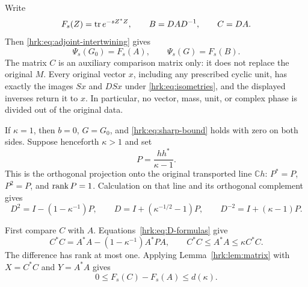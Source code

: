 Write
\[
 F_s(Z)=\operatorname{tr} e^{-sZ^*Z},\qquad B=DAD^{-1},\qquad C=DA.
\]
Then \eqref{hrk:eq:adjoint-intertwining} gives
\begin{equation}\label{hrk:eq:trace-identities}
 \Psi_s(G_0)=F_s(A),\qquad \Psi_s(G)=F_s(B).
\end{equation}
The matrix $C$ is an auxiliary comparison matrix only: it does not
replace the original $M$. Every original vector $x$, including any
prescribed cyclic unit, has exactly the images $Sx$ and $DSx$ under
\eqref{hrk:eq:isometries}, and the displayed inverses return it to $x$.
In particular, no vector, mass, unit, or complex phase is divided
out of the original data.

If $\kappa=1$, then $b=0$, $G=G_0$, and \eqref{hrk:eq:sharp-bound}
holds with zero on both sides. Suppose henceforth $\kappa>1$ and set
\begin{equation}\label{hrk:eq:rankone-projector}
 P=\frac{hh^*}{\kappa-1}.
\end{equation}
This is the orthogonal projection onto the original transported
line $\mathbb Ch$: $P^*=P$, $P^2=P$, and $\operatorname{rank} P=1$.
Calculation on that line and its orthogonal complement gives
\begin{equation}\label{hrk:eq:D-formulas}
 D^2=I-(1-\kappa^{-1})P,\qquad
 D=I+(\kappa^{-1/2}-1)P,\qquad
 D^{-2}=I+(\kappa-1)P.
\end{equation}

First compare $C$ with $A$. Equations~\eqref{hrk:eq:D-formulas} give
\begin{equation}\label{hrk:eq:left-comparison}
 C^*C=A^*A-(1-\kappa^{-1})A^*PA,
 \qquad C^*C\leq A^*A\leq\kappa C^*C.
\end{equation}
The difference has rank at most one. Applying
Lemma~\ref{hrk:lem:matrix} with $X=C^*C$ and $Y=A^*A$ gives
\begin{equation}\label{hrk:eq:first-gap}
 0\leq F_s(C)-F_s(A)\leq d(\kappa).
\end{equation}

